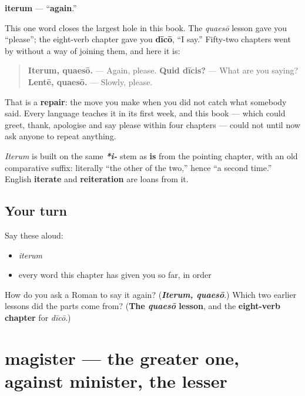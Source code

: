 \begin{cousinweb}
\textbf{iterum} — \textquotedblleft{}\textbf{again}.\textquotedblright{}

This one word closes the largest hole in this book. The \emph{quaesō} lesson gave you \textquotedblleft{}please\textquotedblright{}; the eight-verb chapter gave you \textbf{dīcō}, \textquotedblleft{}I say.\textquotedblright{} Fifty-two chapters went by without a way of joining them, and here it is:

\begin{quote}
\textbf{Iterum, quaesō.} — Again, please. \textbf{Quid dīcis?} — What are you saying? \textbf{Lentē, quaesō.} — Slowly, please.
\end{quote}

That is a \textbf{repair}: the move you make when you did not catch what somebody said. Every language teaches it in its first week, and this book — which could greet, thank, apologise and say please within four chapters — could not until now ask anyone to repeat anything.

\emph{Iterum} is built on the same \emph{\textbf{*i-}} stem as \textbf{is} from the pointing chapter, with an old comparative suffix: literally \textquotedblleft{}the other of the two,\textquotedblright{} hence \textquotedblleft{}a second time.\textquotedblright{} English \textbf{iterate} and \textbf{reiteration} are loans from it.
\end{cousinweb}

\subsection*{Your turn}
Say these aloud:

\begin{itemize}
\raggedright
  \item \emph{iterum}
  \item every word this chapter has given you so far, in order
\end{itemize}

\begin{tcolorbox}[breakable,colback=teal!4,colframe=teal!35!black,title={Before you move on}]
How do you ask a Roman to say it again? (\emph{\textbf{Iterum, quaesō}}.) Which two earlier lessons did the parts come from? (\textbf{The \emph{quaesō} lesson}, and the \textbf{eight-verb chapter} for \emph{dīcō}.)
\end{tcolorbox}
\section[magister, magistrī]{magister — the greater one, against minister, the lesser}

